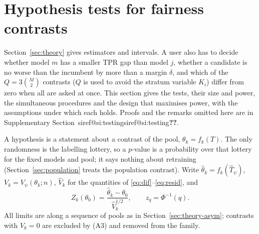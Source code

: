 \documentclass[pdflatex,sn-mathphys-num,iicol]{sn-jnl}
\makeatletter
\theoremstyle{thmstyleone}
\theoremstyle{thmstyletwo}
\theoremstyle{thmstylethree}
\newcommand{\SIref}[1]{\ifcsname siref@#1\endcsname\csname siref@#1\endcsname\else\textbf{??}\fi}
\makeatother
\begin{document}
\section{Hypothesis tests for fairness contrasts}\label{sec:testing}

Section~\ref{sec:theory} gives estimators and intervals. A user also has to decide whether model $m$ has a smaller TPR gap than model $j$, whether a candidate is no worse than the incumbent by more than a margin $\delta$, and which of the $Q=3\binom M2$ contrasts ($Q$ is used to avoid the stratum variable $K_i$) differ from zero when all are asked at once. This section gives the tests, their size and power, the simultaneous procedures and the design that maximises power, with the assumptions under which each holds. Proofs and the remarks omitted here are in Supplementary Section~\SIref{si:testing}.

A hypothesis is a statement about a contrast of the pool, $\theta_k=f_k(T)$. The only randomness is the labelling lottery, so a $p$-value is a probability over that lottery for the fixed models and pool; it says nothing about retraining (Section~\ref{sec:population} treats the population contrast). Write $\hat\theta_k=f_k(\hat T_\psi)$, $V_k=V_\psi(\theta_k;n)$, $\hat V_k$ for the quantities of \eqref{eq:dif}--\eqref{eq:resid}, and
\begin{equation}\label{eq:zstat}
Z_k(\theta_0)=\frac{\hat\theta_k-\theta_0}{\hat V_k^{1/2}},\qquad z_q=\Phi^{-1}(q).
\end{equation}
All limits are along a sequence of pools as in Section~\ref{sec:theory-asym}; contrasts with $V_k=0$ are excluded by (A3) and removed from the family.
\end{document}
